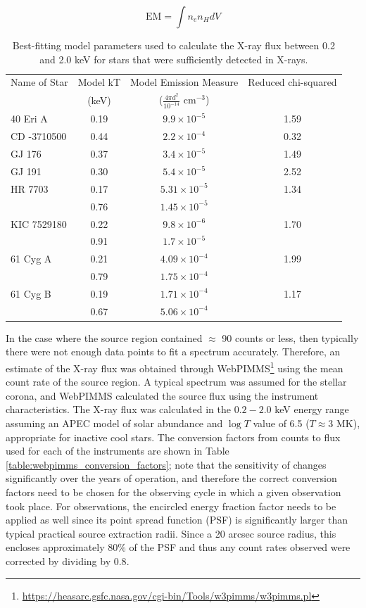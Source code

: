 \begin{equation}
    \text{EM} = \int n_{e}n_{H} dV
    \label{Eq:EM_parameter}
\end{equation}


\begin{table}[h]
\centering
\caption[X-ray spectral modelling results]{Best-fitting model parameters used to calculate the X-ray flux between 0.2 and 2.0 keV for stars that were sufficiently detected in X-rays.}
\begin{tabular}{l c c c}
	\hline \hline
	Name of Star & Model kT & Model Emission Measure  & Reduced chi-squared\\
    & (keV)          &($\frac{4\pi d^2}{10^{-14}}$ cm$^{-3}$) & \\
	\hline
	40 Eri A & 0.19 & $9.9\times 10^{-5}$ & 1.59\\
	CD -3710500 & 0.44 & $2.2\times 10^{-4}$ & 0.32\\
	GJ 176 & 0.37 & $3.4\times 10^{-5}$ & 1.49\\
	GJ 191 & 0.30 & $5.4\times 10^{-5}$ & 2.52\\
	HR 7703 & 0.17 & $5.31\times 10^{-5}$ & 1.34\\
	& 0.76 & $1.45\times 10^{-5}$  &\\
	KIC 7529180 & 0.22 & $9.8\times 10^{-6}$ & 1.70\\
	& 0.91 & $1.7\times 10^{-5}$  &\\
	61 Cyg A & 0.21 & $4.09\times 10^{-4}$ & 1.99\\
	& 0.79 & $1.75\times 10^{-4}$  &\\
	61 Cyg B & 0.19 & $1.71\times 10^{-4}$ & 1.17\\
	& 0.67 & $5.06\times 10^{-4}$  &\\
	\hline
	\end{tabular}
	\label{table:spectral_fit_details}
\end{table}

In the case where the source region contained $\approx$ 90 counts or less, then typically there were not enough data points to fit a spectrum accurately. Therefore, an estimate of the X-ray flux was obtained through WebPIMMS\footnote{\url{https://heasarc.gsfc.nasa.gov/cgi-bin/Tools/w3pimms/w3pimms.pl}} using the mean count rate of the source region. A typical spectrum was assumed for the stellar corona, and WebPIMMS calculated the source flux using the instrument characteristics. The X-ray flux was calculated in the $0.2 - 2.0$ keV energy range assuming an APEC model of solar abundance and $\log T$ value of 6.5 ($T \approx 3$ MK), appropriate for inactive cool stars. The conversion factors from counts to flux used for each of the instruments are shown in Table \ref{table:webpimms_conversion_factors}; note that the sensitivity of \Chandra changes significantly over the years of operation, and therefore the correct conversion factors need to be chosen for the observing cycle in which a given observation took place. For \XMM observations, the encircled energy fraction factor needs to be applied as well since its point spread function (PSF) is significantly larger than typical practical source extraction radii. Since a 20 arcsec source radius, this encloses approximately 80\% of the PSF and thus any count rates observed were corrected by dividing by $0.8$.


